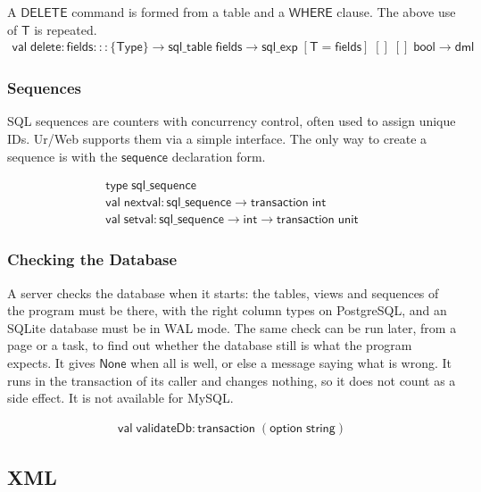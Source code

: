 \documentclass{article}
\newcommand{\mt}[1]{\mathsf{#1}}
\begin{document}
A $\mt{DELETE}$ command is formed from a table and a $\mt{WHERE}$ clause.  The above use of $\mt{T}$ is repeated.
$$\begin{array}{l}
  \mt{val} \; \mt{delete} : \mt{fields} ::: \{\mt{Type}\} \to \mt{sql\_table} \; \mt{fields} \to \mt{sql\_exp} \; [\mt{T} = \mt{fields}] \; [] \; [] \; \mt{bool} \to \mt{dml}
\end{array}$$

\subsubsection{Sequences}

SQL sequences are counters with concurrency control, often used to assign unique IDs.  Ur/Web supports them via a simple interface.  The only way to create a sequence is with the $\mt{sequence}$ declaration form.

$$\begin{array}{l}
  \mt{type} \; \mt{sql\_sequence} \\
  \mt{val} \; \mt{nextval} : \mt{sql\_sequence} \to \mt{transaction} \; \mt{int} \\
  \mt{val} \; \mt{setval} : \mt{sql\_sequence} \to \mt{int} \to \mt{transaction} \; \mt{unit}
\end{array}$$

\subsubsection{Checking the Database}

A server checks the database when it starts: the tables, views and sequences of the program must be there, with the right column types on PostgreSQL, and an SQLite database must be in WAL mode.  The same check can be run later, from a page or a task, to find out whether the database still is what the program expects.  It gives $\mt{None}$ when all is well, or else a message saying what is wrong.  It runs in the transaction of its caller and changes nothing, so it does not count as a side effect.  It is not available for MySQL.

$$\begin{array}{l}
  \mt{val} \; \mt{validateDb} : \mt{transaction} \; (\mt{option} \; \mt{string})
\end{array}$$


\subsection{\label{xml}XML}
\end{document}
